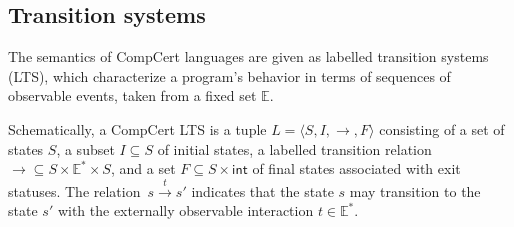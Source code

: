 \documentclass[sigplan,10pt,review,anonymous]{acmart}
\newcommand{\kw}[1]{\ensuremath{ \mathsf{#1} }}
\newcommand{\refby}{\sqsubseteq}
\begin{document}
%

\subsection{Transition systems} %

The semantics of CompCert languages are
given as labelled transition systems (LTS),
which characterize a program's behavior in terms of
sequences of observable events,
taken from a fixed set $\mathbb{E}$.

Schematically, a CompCert LTS
is a tuple
$L = \langle S, I, {\rightarrow}, F \rangle$
consisting of
a set of states $S$,
a subset $I \subseteq S$ of initial states,
a labelled transition relation
${\rightarrow} \subseteq S \times \mathbb{E}^* \times S$,
and a set
$F \subseteq S \times \kw{int}$
of final states associated with exit statuses.
The relation~$s \stackrel{t}{\rightarrow} s'$
indicates that the state $s$ may transition to the state $s'$
with the externally observable interaction $t \in \mathbb{E}^*$.
\end{document}
